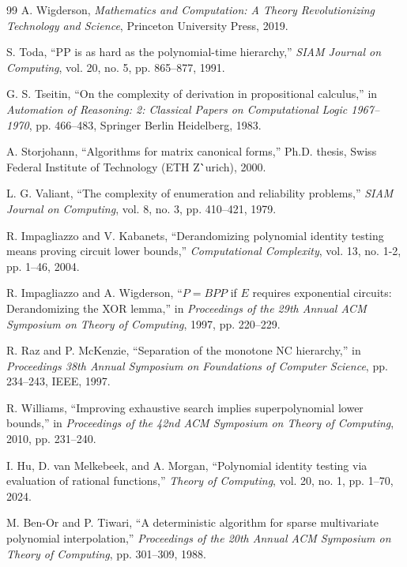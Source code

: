 \documentclass[12pt]{article}
\theoremstyle{definition}
\theoremstyle{definition}
\theoremstyle{remark}
\theoremstyle{remark}
\begin{document}
\begin{thebibliography}{99}
A. Wigderson, \emph{Mathematics and Computation: A Theory Revolutionizing Technology and Science}, Princeton University Press, 2019.

S. Toda, ``PP is as hard as the polynomial-time hierarchy,'' \emph{SIAM Journal on Computing}, vol. 20, no. 5, pp. 865--877, 1991.

G. S. Tseitin, ``On the complexity of derivation in propositional calculus,'' in \emph{Automation of Reasoning: 2: Classical Papers on Computational Logic 1967--1970}, pp. 466--483, Springer Berlin Heidelberg, 1983.

A. Storjohann, ``Algorithms for matrix canonical forms,'' Ph.D. thesis, Swiss Federal Institute of Technology (ETH Z\``urich), 2000.

L. G. Valiant, ``The complexity of enumeration and reliability problems,'' \emph{SIAM Journal on Computing}, vol. 8, no. 3, pp. 410--421, 1979.

R. Impagliazzo and V. Kabanets, ``Derandomizing polynomial identity testing means proving circuit lower bounds,'' \emph{Computational Complexity}, vol. 13, no. 1-2, pp. 1--46, 2004.

R. Impagliazzo and A. Wigderson, ``$P = BPP$ if $E$ requires exponential circuits: Derandomizing the XOR lemma,'' in \emph{Proceedings of the 29th Annual ACM Symposium on Theory of Computing}, 1997, pp. 220--229.

R. Raz and P. McKenzie, ``Separation of the monotone NC hierarchy,'' in \emph{Proceedings 38th Annual Symposium on Foundations of Computer Science}, pp. 234--243, IEEE, 1997.

R. Williams, ``Improving exhaustive search implies superpolynomial lower bounds,'' in \emph{Proceedings of the 42nd ACM Symposium on Theory of Computing}, 2010, pp. 231--240.

I. Hu, D. van Melkebeek, and A. Morgan, ``Polynomial identity testing via evaluation of rational functions,'' \emph{Theory of Computing}, vol. 20, no. 1, pp. 1--70, 2024.

M. Ben-Or and P. Tiwari, ``A deterministic algorithm for sparse multivariate polynomial interpolation,'' \emph{Proceedings of the 20th Annual ACM Symposium on Theory of Computing}, pp. 301--309, 1988.


\end{thebibliography}
\end{document}

